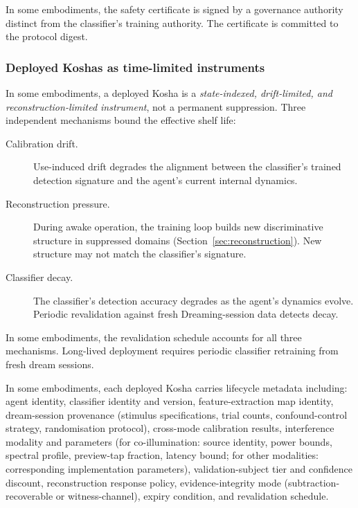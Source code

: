 \documentclass[a4paper,12pt]{article}
\begin{document}
In some embodiments, the safety certificate is signed by a governance
authority distinct from the classifier's training authority. The
certificate is committed to the protocol digest.

\subsubsection{Deployed Koshas as time-limited instruments}


In some embodiments, a deployed Kosha is a \emph{state-indexed,
drift-limited, and reconstruction-limited instrument}, not a
permanent suppression. Three independent mechanisms bound the
effective shelf life:

\begin{description}
  \item[Calibration drift.] Use-induced drift degrades the alignment
    between the classifier's trained detection signature and the
    agent's current internal dynamics.
  \item[Reconstruction pressure.] During awake operation, the
    training loop builds new discriminative structure in suppressed
    domains (Section~\ref{sec:reconstruction}). New structure may
    not match the classifier's signature.
  \item[Classifier decay.] The classifier's detection accuracy
    degrades as the agent's dynamics evolve. Periodic revalidation
    against fresh Dreaming-session data detects decay.
\end{description}

In some embodiments, the revalidation schedule accounts for all three
mechanisms. Long-lived deployment requires periodic classifier
retraining from fresh dream sessions.

In some embodiments, each deployed Kosha carries lifecycle metadata
including: agent identity, classifier identity and version,
feature-extraction map identity, dream-session provenance (stimulus
specifications, trial counts, confound-control strategy,
randomisation protocol), cross-mode calibration results,
interference modality and parameters (for co-illumination: source
identity, power bounds, spectral profile, preview-tap fraction,
latency bound; for other modalities: corresponding implementation
parameters), validation-subject tier and confidence discount,
reconstruction response policy, evidence-integrity mode
(subtraction-recoverable or witness-channel), expiry condition, and
revalidation schedule.
\end{document}
